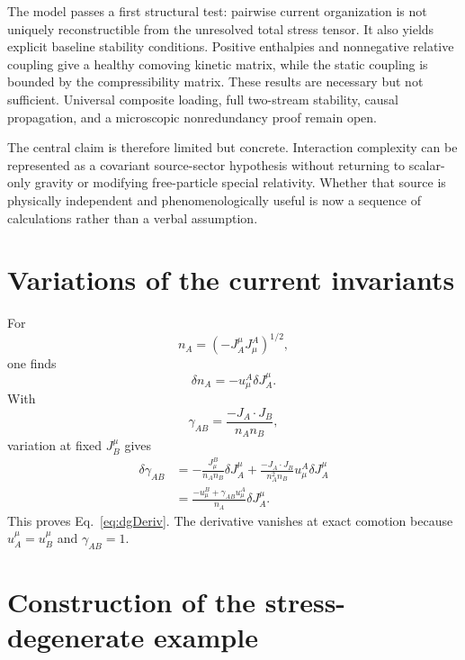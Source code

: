 \documentclass[11pt]{article}
\begin{document}
The model passes a first structural test: pairwise current organization is not uniquely reconstructible from the unresolved total stress tensor.  It also yields explicit baseline stability conditions.  Positive enthalpies and nonnegative relative coupling give a healthy comoving kinetic matrix, while the static coupling is bounded by the compressibility matrix.  These results are necessary but not sufficient.  Universal composite loading, full two-stream stability, causal propagation, and a microscopic nonredundancy proof remain open.

The central claim is therefore limited but concrete.  Interaction complexity can be represented as a covariant source-sector hypothesis without returning to scalar-only gravity or modifying free-particle special relativity.  Whether that source is physically independent and phenomenologically useful is now a sequence of calculations rather than a verbal assumption.

\appendix

\section{Variations of the current invariants}

For
\begin{equation}
n_A=(-J_A^\mu J^A_\mu)^{1/2},
\end{equation}
one finds
\begin{equation}
\delta n_A=-u^A_\mu\delta J_A^\mu.
\end{equation}
With
\begin{equation}
\gamma_{AB}=\frac{-J_A\cdot J_B}{n_An_B},
\end{equation}
variation at fixed $J_B^\mu$ gives
\begin{align}
\delta\gamma_{AB}
&=-\frac{J^B_\mu}{n_An_B}\delta J_A^\mu
+\frac{-J_A\cdot J_B}{n_A^2n_B}u^A_\mu\delta J_A^\mu\nonumber\\
&=\frac{-u^B_\mu+\gamma_{AB}u^A_\mu}{n_A}\delta J_A^\mu.
\end{align}
This proves Eq.~\eqref{eq:dgDeriv}.  The derivative vanishes at exact comotion because $u_A^\mu=u_B^\mu$ and $\gamma_{AB}=1$.

\section{Construction of the stress-degenerate example}
\end{document}
